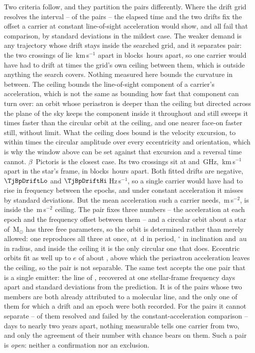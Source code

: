 Two criteria follow, and they partition the pairs differently. Where the drift
grid resolves the interval -- \TjNPower{} of the \TjNPair{} pairs -- the
elapsed time and the two drifts fix the offset a carrier at constant
line-of-sight acceleration would show, and all \TjNPower{} fail that
comparison, by \TjSigMin{} standard deviations in the mildest case. The weaker
demand is any trajectory whose drift stays inside the searched grid, and it
separates \TjNExcl{} pair: the two crossings of \EcGridStar{} lie
\EcGridDvKms\,km\,s$^{-1}$ apart in blocks \EcGridDtH\,hours apart, so one
carrier would have had to drift at \EcGridFactor{} times the grid's own
ceiling between them, which is outside anything the search covers. Nothing
measured here bounds the curvature in between. The ceiling bounds the
line-of-sight component of a carrier's acceleration, which is not the same as
bounding how fast that component can turn over: an orbit whose periastron is
deeper than the ceiling but directed across the plane of the sky keeps the
component inside it throughout and still sweeps it \EcRateSupFac{} times
faster than the circular orbit at the ceiling, and one nearer face-on faster
still, without limit. What the ceiling does bound is the velocity
excursion, to within \EcVsupFac{} times the circular amplitude over every
eccentricity and orientation, which is why the window above can be set against
that excursion and a reversal time cannot.
$\beta$~Pictoris is the closest case. Its two crossings sit at \TjBpNuLo{}
and \TjBpNuHi\,GHz, \TjBpDvKms\,km\,s$^{-1}$ apart in the star's frame, in
blocks \TjBpDtH\,hours apart. Both fitted drifts are negative,
$\TjBpDriftLo$ and $\TjBpDriftHi$\,Hz\,s$^{-1}$, so a single carrier would
have had to rise in frequency between the epochs, and under constant
acceleration it misses by \TjBpNSig{} standard deviations. But the mean
acceleration such a carrier needs, \TjBpAccelReq\,m\,s$^{-2}$, is inside the
\WdAGrid\,m\,s$^{-2}$ ceiling. The pair fixes three numbers -- the
acceleration at each epoch and the frequency offset between them -- and a
circular orbit about a star of \EcMassBp\,M$_\odot$ \citep{Crifo1997} has
three free parameters, so the orbit is determined rather than merely
allowed: one reproduces all three at once, at \ObDayBp\,d in period,
\ObIncBp$^\circ$ in inclination and \ObAuBp\,au in radius, and inside the
ceiling it is the only circular one that does. Eccentric orbits fit as well
up to $e$ of about \ObEccMaxBp, above which the periastron acceleration
leaves the ceiling, so the pair is not separable. The same test accepts the one pair that is a single emitter: the
\TjCtlLine{} line of \TjCtlStar, recovered at one stellar-frame frequency
\TjCtlDtD{} days apart and \TjCtlNSig{} standard deviations from the
prediction. It is \TjNCandAttrTest{} of the \TjNCandAttr{} pairs whose two
members are both already attributed to a molecular line, and the only one of
them for which a drift and an epoch were both recorded. For the \TjNOpen{} pairs
it cannot
separate -- \TjNPowerOpen{} of them resolved and failed by the
constant-acceleration comparison -- \TjDtOpenMinD{} days to nearly two years
apart, nothing measurable tells one carrier from two, and only the agreement
of their number with chance bears on them. Such a pair is \emph{open}:
neither a confirmation nor an exclusion.

